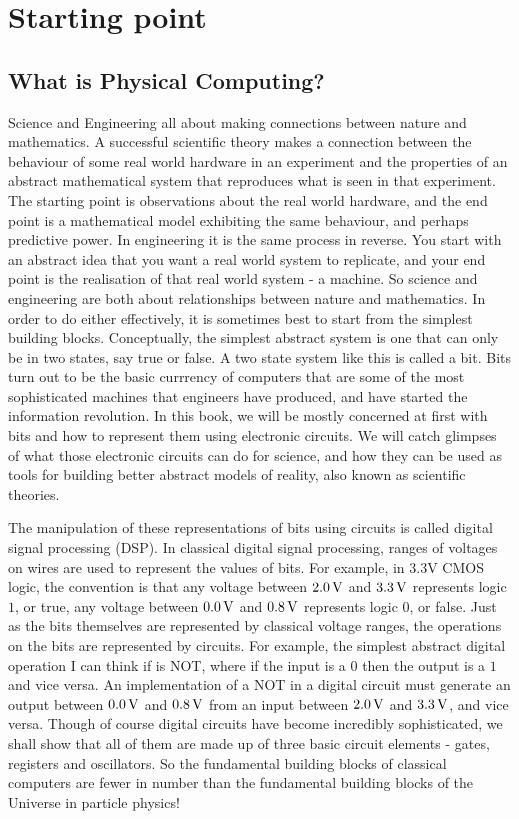 \documentclass[../physical_computing.tex]{subfiles}
\begin{document}
\chapter{Starting point}

\section{What is Physical Computing?}
\label{sec:what_is_physical_computing}

Science and Engineering all about making connections between nature and mathematics. A successful scientific theory makes a connection between the behaviour of some real world hardware in an experiment and the properties of an abstract mathematical system that reproduces what is seen in that experiment. The starting point is observations about the real world hardware, and the end point is a mathematical model exhibiting the same behaviour, and perhaps predictive power. In engineering it is the same process in reverse. You start with an abstract idea that you want a real world system to replicate, and your end point is the realisation of that real world system - a machine. So science and engineering are both about relationships between nature and mathematics. In order to do either effectively, it is sometimes best to start from the simplest building blocks. Conceptually, the simplest abstract system is one that can only be in two states, say true or false. A two state system like this is called a bit. Bits turn out to be the basic currrency of computers that are some of the most sophisticated machines that engineers have produced, and have started the information revolution. In this book, we will be mostly concerned at first with bits and how to represent them using electronic circuits. We will catch glimpses of what those electronic circuits can do for science, and how they can be used as tools for building better abstract models of reality, also known as scientific theories.

The manipulation of these representations of bits using circuits is called digital signal processing (DSP). In classical digital signal processing, ranges of voltages on wires are used to represent the values of bits. For example, in 3.3V CMOS logic, the convention is that any voltage between $\rm 2.0\,V$ and $\rm 3.3\,V$ represents logic $1$, or true, any voltage between $\rm 0.0\,V$ and $\rm 0.8\,V$ represents logic $0$, or false. Just as the bits themselves are represented by classical voltage ranges, the operations on the bits are represented by circuits. For example, the simplest abstract digital operation I can think if is NOT, where if the input is a $0$ then the output is a $1$ and vice versa. An implementation of a NOT in a digital circuit must generate an output between $\rm 0.0\,V$ and $\rm 0.8\,V$ from an input between $\rm 2.0\,V$ and $\rm 3.3\,V$, and vice versa. Though of course digital circuits have become incredibly sophisticated, we shall show that all of them are made up of three basic circuit elements - gates, registers and oscillators. So the fundamental building blocks of classical computers are fewer in number than the fundamental building blocks of the Universe in particle physics!
\end{document}
